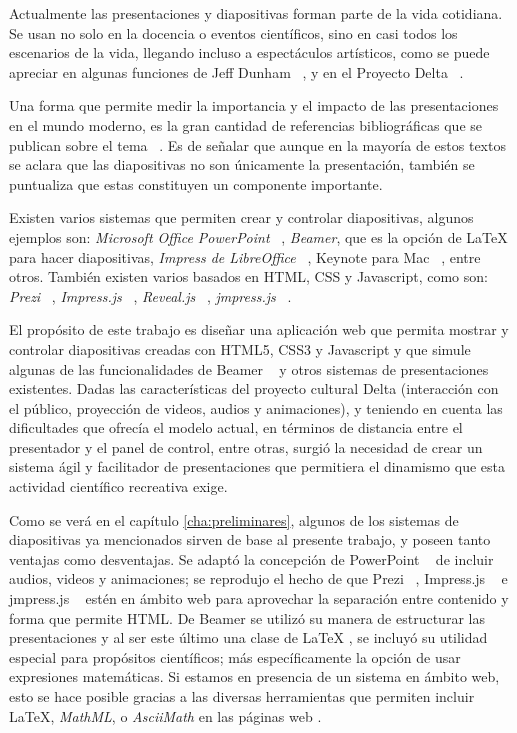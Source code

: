 \begin{introduction}

	Actualmente las presentaciones y diapositivas forman parte de la vida cotidiana. Se usan no solo en la docencia o eventos científicos, sino en casi todos los escenarios de la vida, llegando incluso a espectáculos artísticos, como se puede apreciar en algunas funciones de Jeff Dunham ~\cite{dunham}, y en el Proyecto Delta ~\cite{delta}.


	Una forma que permite medir la importancia y el impacto de las presentaciones en el mundo moderno, es la gran cantidad de referencias bibliográficas que se publican sobre el tema ~\cite{alley, duarte, tufte}. Es de señalar que aunque en la mayoría de estos textos se aclara que las diapositivas no son únicamente la presentación, también se puntualiza que estas constituyen un componente importante.

	Existen varios sistemas que permiten crear y controlar diapositivas, algunos ejemplos son: \textit{Microsoft Office PowerPoint} ~\cite{powerpoint}, \textit{Beamer}, que es la opción de \LaTeX{} para hacer diapositivas, \textit{Impress de LibreOffice} ~\cite{libreoffice}, Keynote para Mac ~\cite{keynote}, entre otros. También existen varios basados en HTML, CSS y Javascript, como son: \textit{Prezi} ~\cite{prezi}, \textit{Impress.js} ~\cite{impress}, \textit{Reveal.js} ~\cite{reveal}, \textit{jmpress.js} ~\cite{jmpress}.

	El propósito de este trabajo es diseñar una aplicación web que permita mostrar y controlar diapositivas creadas con HTML5, CSS3 y Javascript y que simule algunas de las funcionalidades de Beamer ~\cite{beamer} y otros sistemas de presentaciones existentes. Dadas las características del proyecto cultural Delta (interacción con el público, proyección de videos, audios y animaciones), y teniendo en cuenta las dificultades que ofrecía el modelo actual, en términos de distancia entre el presentador y el panel de control, entre otras, surgió la necesidad de crear un sistema ágil y facilitador de presentaciones que permitiera el dinamismo que esta actividad científico recreativa exige.

	Como se verá en el capítulo \ref{cha:preliminares}, algunos de los sistemas de diapositivas ya mencionados sirven de base al presente trabajo, y poseen tanto ventajas como desventajas. Se adaptó la concepción de PowerPoint ~\cite{powerpoint} de incluir audios, videos y animaciones; se reprodujo el hecho de que Prezi ~\cite{prezi}, Impress.js ~\cite{impress} e jmpress.js ~\cite{jmpress} estén en ámbito web para aprovechar la separación entre contenido y forma que permite HTML. De Beamer se utilizó su manera de estructurar las presentaciones y al ser este último una clase de \LaTeX{} \cite{latex}, se incluyó su utilidad especial para propósitos científicos; más específicamente la opción de usar expresiones matemáticas. Si estamos en presencia de un sistema en ámbito web, esto se hace posible gracias a las diversas herramientas que permiten incluir \LaTeX, \textit{MathML}, o \textit{AsciiMath} en las páginas web \cite{mathjax, katex, phpmath}. 


\end{introduction}
